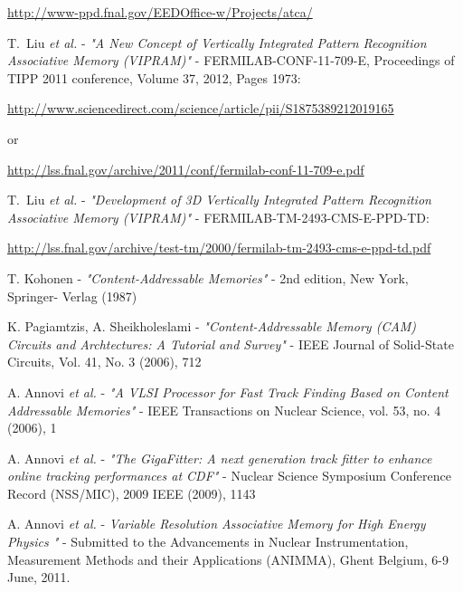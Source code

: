 \documentclass{cmspaper}
\begin{document}
\begin{thebibliography}{99}
\url{http://www-ppd.fnal.gov/EEDOffice-w/Projects/atca/}

 T.~Liu {\it et al.} - {\it "A New Concept of Vertically Integrated Pattern Recognition Associative Memory (VIPRAM)"} - FERMILAB-CONF-11-709-E, Proceedings of TIPP 2011 conference, Volume 37, 2012, Pages 1973: 

\url{http://www.sciencedirect.com/science/article/pii/S1875389212019165}

or 

\url{http://lss.fnal.gov/archive/2011/conf/fermilab-conf-11-709-e.pdf}

 T.~Liu {\it et al.} - {\it "Development of 3D Vertically Integrated Pattern Recognition Associative Memory (VIPRAM)"} - FERMILAB-TM-2493-CMS-E-PPD-TD:

\url{http://lss.fnal.gov/archive/test-tm/2000/fermilab-tm-2493-cms-e-ppd-td.pdf}





 T. Kohonen - {\it "Content-Addressable Memories"} - 2nd edition, New York, Springer- Verlag (1987)

 K. Pagiamtzis, A. Sheikholeslami - {\it "Content-Addressable Memory (CAM) Circuits and Archtectures: A Tutorial and Survey"} - IEEE Journal of Solid-State Circuits, Vol. 41, No. 3 (2006), 712





 A. Annovi {\it et al.} - {\it "A VLSI Processor for Fast Track Finding Based on Content Addressable Memories"} - IEEE Transactions on Nuclear Science, vol. 53, no. 4 (2006), 1

 A. Annovi {\it et al.} - {\it "The GigaFitter: A next generation track fitter to enhance online tracking performances at CDF"} - Nuclear Science Symposium Conference Record (NSS/MIC), 2009 IEEE (2009), 1143


 A. Annovi {\it et al.}  - {\it Variable Resolution Associative Memory for High Energy Physics
"} - Submitted to the Advancements in Nuclear Instrumentation, Measurement Methods and their Applications (ANIMMA), Ghent Belgium, 6-9 June, 2011.



\end{thebibliography}
\newpage
\appendix
%
%
%
%
\end{document}
